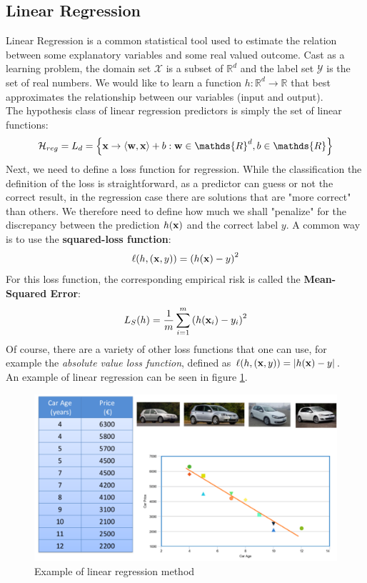 \documentclass[12pt]{report}
\theoremstyle{plain}
\newcommand\mcl[1]{\mathcal{#1}}
\newcommand\sprod[2]{\langle \vb{#1},\vb{#2}\rangle}
\begin{document}
\begin{flushleft}
\section{Linear Regression}
Linear Regression is a common statistical tool used to estimate the relation 
between some explanatory variables and some real valued outcome. Cast as a 
learning problem, the domain set $\mcl{X}$ is a subset of $\mathds{R}^d$ and 
the label set $\mcl{Y}$ is the set of real numbers. We would like to learn a 
function $h:\mathds{R}^d\to\mathds{R}$ that best approximates the relationship 
between our variables (input and output).\\
The hypothesis class of linear regression predictors is simply the set of 
linear functions:
\[ 
\mcl{H}_{reg}=L_d=\left\{\vb{x}\to\sprod{w}{x}+b:\vb{w}\in\mathds{R}^d, 
b\in\mathds{R}
 \right\} \]
Next, we need to define a loss function for regression. While the 
classification the definition of the loss is straightforward, as a predictor 
can guess or not the correct result, in the regression case there are solutions 
that are "more correct" than others. We therefore need to define how much we 
shall "penalize" for the discrepancy between the prediction $h(\vb{x})$ and the 
correct label $y$. A common way is to use the \textbf{squared-loss function}:
\[ \ell(h,(\vb{x},y)) = \left(h(\vb{x})-y\right)^2 \]
For this loss function, the corresponding empirical risk is called the 
\textbf{Mean-Squared Error}:
\begin{equation}
L_S(h)=\frac{1}{m}\sum_{i=1}^m \left(h(\vb{x}_i)-y_i\right)^2
\label{eq:mean_squared_err}
\end{equation}
Of course, there are a variety of other loss functions that one can use, for 
example the \textit{absolute value loss function}, defined as 
$\ell(h,(\vb{x},y)) = \abs{h(\vb{x})-y}$.\\
An example of linear regression can be seen in figure \ref{fig:ex_lin_regr}.
\begin{figure}
	\centering
	\includegraphics[scale=0.5]{images/linregress_example.pdf}
	\caption{Example of linear regression method}
	\label{fig:ex_lin_regr}
\end{figure}



\end{flushleft}
\end{document}
